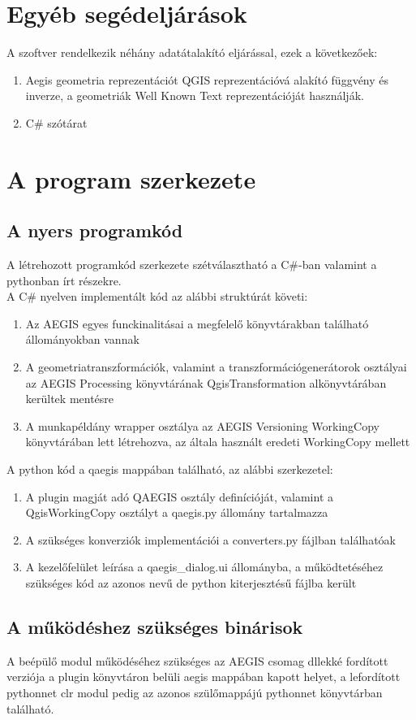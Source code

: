 \section{Egyéb segédeljárások}
A szoftver rendelkezik néhány adatátalakító eljárással, ezek a következőek:
\begin{enumerate}
	\item Aegis geometria reprezentációt QGIS reprezentációvá alakító függvény és inverze, a geometriák Well Known Text reprezentációját használják.
	\item C\# szótárat 
\end{enumerate}

\section{A program szerkezete}
\subsection{A nyers programkód}
A létrehozott programkód szerkezete szétválasztható a C\#-ban valamint a pythonban írt részekre.\\
A C\# nyelven implementált kód az alábbi struktúrát követi:
\begin{enumerate}
	\item Az AEGIS egyes funckinalitásai a megfelelő könyvtárakban található állományokban vannak
	\item A geometriatranszformációk, valamint a transzformációgenerátorok osztályai az AEGIS Processing könyvtárának QgisTransformation alkönyvtárában kerültek mentésre
	\item A munkapéldány wrapper osztálya az AEGIS Versioning WorkingCopy könyvtárában lett létrehozva, az általa használt eredeti WorkingCopy mellett 
\end{enumerate}
A python kód a qaegis mappában található, az alábbi szerkezetel:
\begin{enumerate}
	\item A plugin magját adó QAEGIS osztály definícióját, valamint a QgisWorkingCopy osztályt a qaegis.py állomány tartalmazza
	\item A szükséges konverziók implementációi a converters.py fájlban találhatóak
	\item A kezelőfelület leírása a qaegis\_dialog.ui állományba, a működtetéséhez szükséges kód az azonos nevű de python kiterjesztésű fájlba került
\end{enumerate}
\subsection{A működéshez szükséges binárisok}
A beépülő modul működéséhez szükséges az AEGIS csomag dllekké fordított verziója a plugin könyvtáron belüli aegis mappában kapott helyet, a lefordított pythonnet clr modul pedig az azonos szülőmappájú pythonnet könyvtárban található.

